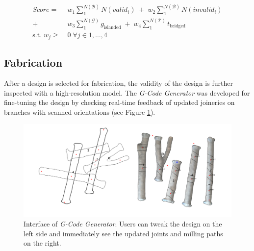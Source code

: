 \begin{equation} \label{eq:cost}
 \begin{aligned}
 Score =  &\; w_1  \sum_{1}^{N(\mathcal{B})}N(valid_i) \; +
\; w_2  \sum_{1}^{N(\mathcal{B})} N(invalid_i) \\
+ &\; w_3  \sum_{1}^{N(\mathcal{G})} g_{\text{islanded}} \;+
\; w_4  \sum_{1}^{N(\mathcal{T})} t_{\text{bridged}}
 \\
   \textrm{s.t.} \; w_j  \geq  &\;0 \; \forall j \in 1, \dotsc , 4
 \end{aligned}
\end{equation}

\subsection{Fabrication}
After a design is selected for fabrication, the validity of the design is further inspected with a high-resolution model.
The \textit{G-Code Generator} was developed for fine-tuning the design by checking real-time feedback of updated joineries on branches with scanned orientations (see Figure \ref{fig:gcode_gen}).

\begin{figure}[ht]
  \begin{center}
    \includegraphics[width = 0.4\paperwidth]{images/system/joint_generator_2.png}
    \caption{Interface of \textit{G-Code Generator}. Users can tweak the design on the left side and immediately see the updated joints and milling paths on the right. }
    \label{fig:gcode_gen}
  \end{center}
\end{figure}

